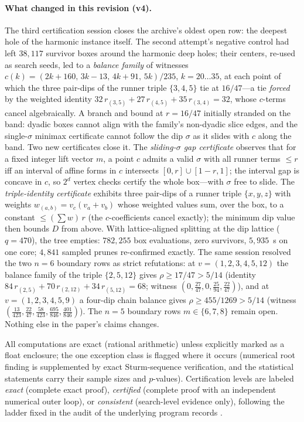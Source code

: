 \paragraph{What changed in this revision (v4).}
The third certification session closes the archive's oldest open row:
the deepest hole of the harmonic instance itself. The second attempt's
negative control had left $38{,}117$ survivor boxes around the harmonic
deep holes; their centers, re-used as search seeds, led to a
\emph{balance family} of witnesses
$c(k)=(2k{+}160,\,3k{-}13,\,4k{+}91,\,5k)/235$, $k=20\dots35$, at each
point of which the three pair-dips of the runner triple $\{3,4,5\}$ tie
at $16/47$---a tie \emph{forced} by the weighted identity
$32\,r_{(3,5)}+27\,r_{(4,5)}+35\,r_{(3,4)}=32$, whose $c$-terms cancel
algebraically. A branch and bound at $r=16/47$ initially stranded on the
band: dyadic boxes cannot align with the family's non-dyadic slice edges,
and the single-$\sigma$ minimax certificate cannot follow the dip
$\sigma$ as it slides with $c$ along the band. Two new certificates close
it. The \emph{sliding-$\sigma$ gap certificate} observes that for a
fixed integer lift vector $m$, a point $c$ admits a valid $\sigma$ with
all runner terms $\le r$ iff an interval of affine forms in $c$
intersects $[0,r]\cup[1-r,1]$; the interval gap is concave in $c$, so
$2^d$ vertex checks certify the whole box---with $\sigma$ free to slide.
The \emph{triple-identity certificate} exhibits three pair-dips of a
runner triple $\{x,y,z\}$ with weights $w_{(a,b)}=v_c(v_a{+}v_b)$ whose
weighted values sum, over the box, to a constant $\le(\sum w)\,r$
(the $c$-coefficients cancel exactly); the minimum dip value then bounds
$D$ from above. With lattice-aligned splitting at the dip lattice
($q=470$), the tree empties: $782{,}255$ box evaluations, zero
survivors, $5{,}935$~s on one core; $4{,}841$ sampled prunes
re-confirmed exactly. The same session resolved the two $n=6$ boundary
rows as strict refutations: at $v=(1,2,3,4,5,12)$ the balance family of
the triple $\{2,5,12\}$ gives $\rho\ge17/47>5/14$ (identity
$84\,r_{(2,5)}+70\,r_{(2,12)}+34\,r_{(5,12)}=68$; witness
$(0,\tfrac{27}{47},0,\tfrac{25}{94},\tfrac{22}{47})$), and at
$v=(1,2,3,4,5,9)$ a four-dip chain balance gives
$\rho\ge455/1269>5/14$ (witness
$(\tfrac{13}{423},\tfrac{22}{47},\tfrac{58}{423},\tfrac{695}{846},
\tfrac{401}{846})$). The $n=5$ boundary rows $m\in\{6,7,8\}$ remain
open. Nothing else in the paper's claims changes.

All computations are exact (rational arithmetic) unless explicitly marked
as a float enclosure; the one exception class is flagged where it occurs
(numerical root finding is supplemented by exact Sturm-sequence
verification, and the statistical statements carry their sample sizes and
$p$-values). Certification levels are labeled \emph{exact}
(complete exact proof), \emph{certified} (complete proof with an
independent numerical outer loop), or \emph{consistent} (search-level
evidence only), following the ladder fixed in the audit of the underlying
program records \cite{prog-artifacts}.

